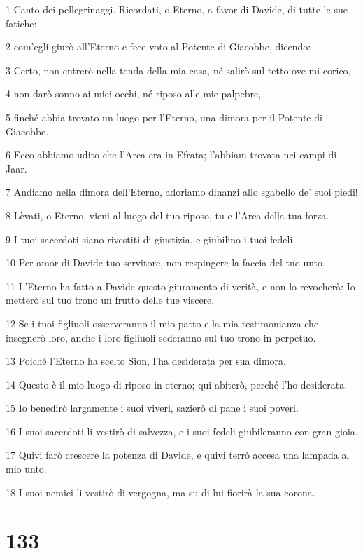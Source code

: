 \par 1 Canto dei pellegrinaggi. Ricordati, o Eterno, a favor di Davide, di tutte le sue fatiche:
\par 2 com'egli giurò all'Eterno e fece voto al Potente di Giacobbe, dicendo:
\par 3 Certo, non entrerò nella tenda della mia casa, né salirò sul tetto ove mi corico,
\par 4 non darò sonno ai miei occhi, né riposo alle mie palpebre,
\par 5 finché abbia trovato un luogo per l'Eterno, una dimora per il Potente di Giacobbe.
\par 6 Ecco abbiamo udito che l'Arca era in Efrata; l'abbiam trovata nei campi di Jaar.
\par 7 Andiamo nella dimora dell'Eterno, adoriamo dinanzi allo sgabello de' suoi piedi!
\par 8 Lèvati, o Eterno, vieni al luogo del tuo riposo, tu e l'Arca della tua forza.
\par 9 I tuoi sacerdoti siano rivestiti di giustizia, e giubilino i tuoi fedeli.
\par 10 Per amor di Davide tuo servitore, non respingere la faccia del tuo unto.
\par 11 L'Eterno ha fatto a Davide questo giuramento di verità, e non lo revocherà: Io metterò sul tuo trono un frutto delle tue viscere.
\par 12 Se i tuoi figliuoli osserveranno il mio patto e la mia testimonianza che insegnerò loro, anche i loro figliuoli sederanno sul tuo trono in perpetuo.
\par 13 Poiché l'Eterno ha scelto Sion, l'ha desiderata per sua dimora.
\par 14 Questo è il mio luogo di riposo in eterno; qui abiterò, perché l'ho desiderata.
\par 15 Io benedirò largamente i suoi viveri, sazierò di pane i suoi poveri.
\par 16 I suoi sacerdoti li vestirò di salvezza, e i suoi fedeli giubileranno con gran gioia.
\par 17 Quivi farò crescere la potenza di Davide, e quivi terrò accesa una lampada al mio unto.
\par 18 I suoi nemici li vestirò di vergogna, ma su di lui fiorirà la sua corona.

\chapter{133}

